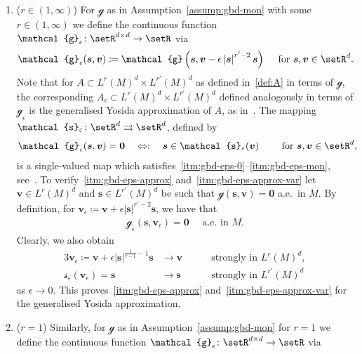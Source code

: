 \documentclass[reqno,a4paper]{amsart}
\def\abs#1{\left| #1 \right|}
\def\vec#1{\boldsymbol{#1}}
\def\toto{\rightrightarrows}
\def\b0{\vec{0}}
\def\bs{\vec{s}}
\def\bv{\vec{v}}
\def\gbd{\vec{\mathcal{g}}}
\def\Srel{\vec{\mathcal{s}}}
\def\Seps{\Srel_{\varepsilon}}
\begin{document}
	\begin{example}\label{ex:gen-Yosida-r} \hfill 
		\begin{enumerate}[label = (\alph*)]
			\item ($r \in (1,\infty)$) \label{itm:gen-Yosida-r}
			For $\gbd$ as in Assumption~\ref{assump:gbd-mon} with some $r \in (1, \infty)$ we define the continuous function $\gbd_{\epsilon} \colon \setR^{d \times d} \to \setR$ via 
			\begin{align*}
				\gbd_{\epsilon} (\bs, \bv) \coloneqq \gbd\left(\bs,\bv - \epsilon \abs{\bs}^{r'-2}
				\bs\right) \quad \text{ for } \bs, \bv \in \setR^d.
			\end{align*}
			Note that for $A \subset L^{r}(M)^d\times L^{r'}(M)^d$ as defined  in~\eqref{def:A} in terms of $\gbd$, the corresponding ${A}_\epsilon \subset L^{r}(M)^d\times L^{r'}(M)^d$ defined analogously in terms of $\gbd_{\epsilon}$ is the generalised Yosida approximation of ${A}$, as  in~\cite[Sec.~4]{Francfort2004}. 
			The mapping~$\Seps \colon \setR^d \toto \setR^d$, defined by 
			\begin{align*}
				\gbd_\epsilon(\bs, \bv) = \b0 \quad \Leftrightarrow : \quad   \bs \in  \Seps(\bv) \qquad \text{ for } \bs, \bv \in \setR^d, 
			\end{align*}
			is a single-valued map which satisfies~\ref{itm:gbd-eps-0}--\ref{itm:gbd-eps-mon}, see~\cite[Lem.~3.29]{T.2018}. 
			To verify~\ref{itm:gbd-eps-approx} and~\ref{itm:gbd-eps-approx-var} let $\bv \in L^{r}(M)^d$ and $\bs \in L^{r'}(M)^d$ be such that $\gbd(\bs,\bv) = \b0$ a.e.~in $M$. 
			By definition, for $\bv_{\epsilon} \coloneqq \bv + \epsilon \abs{\bs}^{r'-2} \bs $,  we have that 
			\begin{align*}
				\gbd_{\epsilon}(\bs,\bv_{\epsilon}) = \b0 \quad \text{ a.e.~in } M. 
			\end{align*}
			Clearly, we also obtain 
			\begin{alignat*}{3}
				\bv_{\epsilon} \coloneqq \bv + \epsilon \abs{\bs}^{\frac{1}{r-1}-1} \bs
				&\to \bv \quad &&\text{ strongly in } L^r(M)^d, \\
				\Seps(\bv_{\epsilon}) = \bs &\to \bs  \quad &&\text{ strongly in } L^{r'}(M)^d
			\end{alignat*}
			as $\epsilon \to 0$. 
			This proves~\ref{itm:gbd-eps-approx} and~\ref{itm:gbd-eps-approx-var} for the generalised Yosida approximation. 
			\item ($r = 1$) 
			Similarly, for $\gbd$ as in Assumption~\ref{assump:gbd-mon} for $r= 1$ we define the continuous function $\gbd_{\epsilon} \colon \setR^{d \times d} \to \setR$ via 

\end{enumerate}
\end{example}
\end{document}
